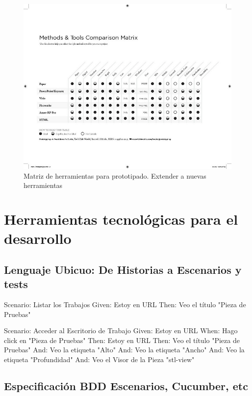 \begin{figure}
\centering
\includegraphics[width=16cm]{Img/UX/UX-matrix.jpg}
\caption[Proto-persona (optional short caption)]{\label{us_figure} Matriz de herramientas para prototipado. Extender a nuevas herramientas}
\end{figure}

\section{Herramientas tecnológicas para el desarrollo}

\subsection{Lenguaje Ubicuo: De Historias a Escenarios y tests}

Scenario: Listar los Trabajos\vskip0mm
  Given: Estoy en URL\vskip0mm
  Then: Veo el título "Pieza de Pruebas"\vskip10mm
 
Scenario: Acceder al Escritorio de Trabajo\vskip0mm
  Given: Estoy en URL\vskip0mm
  When: Hago click en "Pieza de Pruebas"\vskip0mm
  Then: Estoy en URL\vskip0mm
  Then: Veo el título "Pieza de Pruebas"\vskip0mm
  And: Veo la etiqueta "Alto"\vskip0mm
  And: Veo la etiqueta "Ancho"\vskip0mm
  And: Veo la etiqueta "Profundidad"\vskip0mm
  And: Veo el Visor de la Pieza "stl-view"
  
\subsection{Especificación BDD Escenarios, Cucumber, etc}

